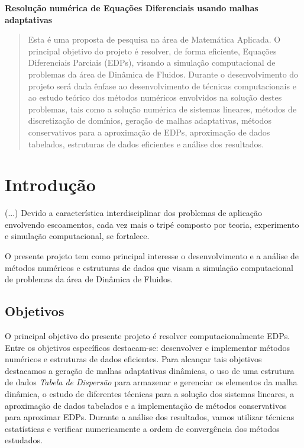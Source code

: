 \documentclass[12pt]{article}
\begin{document}
\vspace*{2cm}
\begin{center}
{\large {\bf Resolução numérica de Equações Diferenciais usando malhas adaptativas}} \\

\vspace{5cm}

\end{center}
\thispagestyle{empty}


\tableofcontents
\thispagestyle{empty}
{}\setcounter{page}{1}

\begin{abstract}
Esta é uma proposta de pesquisa na área de Matemática Aplicada. O principal objetivo do projeto é resolver, de forma eficiente, Equações Diferenciais Parciais (EDPs), visando a simulação computacional de problemas da área de Dinâmica de Fluidos. Durante o desenvolvimento do projeto será dada ênfase ao desenvolvimento de técnicas computacionais e ao estudo teórico dos métodos numéricos envolvidos na solução destes problemas, tais como a solução numérica de sistemas lineares, métodos de discretização de domínios, geração de malhas adaptativas, métodos conservativos para a aproximação de EDPs, aproximação de dados tabelados, estruturas de dados eficientes e análise dos resultados.
\end{abstract}


\section{Introdução}\label{ss.introducao}

(...) Devido a característica interdisciplinar dos problemas de aplicação envolvendo escoamentos, cada vez mais o tripé composto por teoria, experimento e simulação computacional, se fortalece.  

O presente projeto tem como principal interesse o desenvolvimento e a análise de métodos numéricos e estruturas de dados que visam a simulação computacional de problemas da área de Dinâmica de Fluidos.

\subsection{Objetivos}

O principal objetivo do presente projeto é resolver computacionalmente EDPs. Entre os objetivos específicos destacam-se: desenvolver e implementar métodos numéricos e estruturas de dados eficientes. Para alcançar tais objetivos destacamos a geração de malhas adaptativas dinâmicas, o uso de uma estrutura de dados {\em Tabela de Dispersão} para armazenar e gerenciar os elementos da malha dinâmica, o estudo de diferentes técnicas para a solução dos sistemas lineares, a aproximação de dados tabelados e a implementação de métodos conservativos para aproximar EDPs. Durante a análise dos resultados, vamos utilizar técnicas estatísticas e verificar numericamente a ordem de convergência dos métodos estudados.
\end{document}
